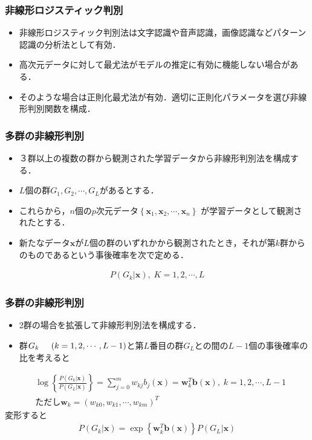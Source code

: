 \documentclass[dvipdfmx,cjk]{beamer}
\theoremstyle{example}
\begin{document}
\begin{frame}
    \frametitle{非線形ロジスティック判別}
    \begin{itemize}
        \item 非線形ロジスティック判別法は文字認識や音声認識，画像認識などパターン認識の分析法として有効．
        \item 高次元データに対して最尤法がモデルの推定に有効に機能しない場合がある．
        \item そのような場合は正則化最尤法が有効．適切に正則化パラメータを選び非線形判別関数を構成．
    \end{itemize}
\end{frame}
\begin{frame}
    \frametitle{多群の非線形判別}
    \begin{itemize}
        \item ３群以上の複数の群から観測された学習データから非線形判別法を構成する．
        \item $L$個の群$G_1,G_2,\cdots , G_L$があるとする．
        \item これらから，$n$個の$p$次元データ$\left\{\boldsymbol{x}_1,\boldsymbol{x}_2,\cdots,\boldsymbol{x}_n\right\}$
              が学習データとして観測されたとする．
        \item 新たなデータ$\boldsymbol{x}$が$L$個の群のいずれかから観測されたとき，それが第$k$群からのものであるという事後確率を次で定める．
    \end{itemize}
    \begin{align*}
        P(G_k|\boldsymbol{x}), \; K=1,2,\cdots ,L
    \end{align*}

\end{frame}
\begin{frame}
    \frametitle{多群の非線形判別}
    \begin{itemize}
        \item 2群の場合を拡張して非線形判別法を構成する．
        \item 群$G_k \hspace{5mm} (k=1,2,\cdots ,L-1)$と第$L$番目の群$G_L$との間の$L-1$個の事後確率の比を考えると
    \end{itemize}
    \begin{align*}
         & \log \left\{\frac{P(G_k|\boldsymbol{x})}{P(G_L|\boldsymbol{x})}\right\} =\sum_{j=0}^{m} w_{kj}b_j(\boldsymbol{x})=\boldsymbol{w}_k^T\boldsymbol{b}(\boldsymbol{x}), \; k=1,2,\cdots , L-1 \\
         & \text{ただし}\boldsymbol{w}_k=(w_{k0},w_{k1},\cdots ,w_{km})^T
    \end{align*}
    変形すると
    \begin{align*}
        P(G_k|\boldsymbol{x})=\exp\left\{\boldsymbol{w}_k^T\boldsymbol{b}(\boldsymbol{x})\right\}P(G_L|\boldsymbol{x}) \tag{A}
    \end{align*}
\end{frame}
\end{document}
